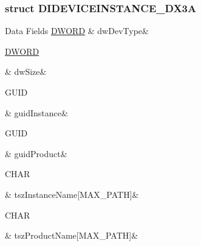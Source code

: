 \subsubsection{struct D\-I\-D\-E\-V\-I\-C\-E\-I\-N\-S\-T\-A\-N\-C\-E\-\_\-\-D\-X3\-A}
\begin{DoxyFields}{Data Fields}
\hypertarget{a00003_a2bdaf065880c5cb7fa08be0bf17027a6}{\hyperlink{a00003_a50e15ae51c87ae06ab29c8148cb5f36c}{D\-W\-O\-R\-D}}\label{a00003_a2bdaf065880c5cb7fa08be0bf17027a6}
&
dw\-Dev\-Type&
\\
\hline

\hypertarget{a00003_a669c5a85f5a9eb97e64ad880fadaaa2d}{\hyperlink{a00003_a50e15ae51c87ae06ab29c8148cb5f36c}{D\-W\-O\-R\-D}}\label{a00003_a669c5a85f5a9eb97e64ad880fadaaa2d}
&
dw\-Size&
\\
\hline

\hypertarget{a00003_a7fba3dbe50344a5643d4b3c3ae186576}{G\-U\-I\-D}\label{a00003_a7fba3dbe50344a5643d4b3c3ae186576}
&
guid\-Instance&
\\
\hline

\hypertarget{a00003_a30bf31754fdd016b11557bf6a75bfc87}{G\-U\-I\-D}\label{a00003_a30bf31754fdd016b11557bf6a75bfc87}
&
guid\-Product&
\\
\hline

\hypertarget{a00003_a0c2016d4a69c9474b7cdf714abb66217}{C\-H\-A\-R}\label{a00003_a0c2016d4a69c9474b7cdf714abb66217}
&
tsz\-Instance\-Name\mbox{[}M\-A\-X\-\_\-\-P\-A\-T\-H\mbox{]}&
\\
\hline

\hypertarget{a00003_ace2ea209eb411d1e909d9bb3e326d5bb}{C\-H\-A\-R}\label{a00003_ace2ea209eb411d1e909d9bb3e326d5bb}
&
tsz\-Product\-Name\mbox{[}M\-A\-X\-\_\-\-P\-A\-T\-H\mbox{]}&
\\
\hline

\end{DoxyFields}
\label{d1/d6e/a00073}
\hypertarget{a00003_d1/d6e/a00073}{}
